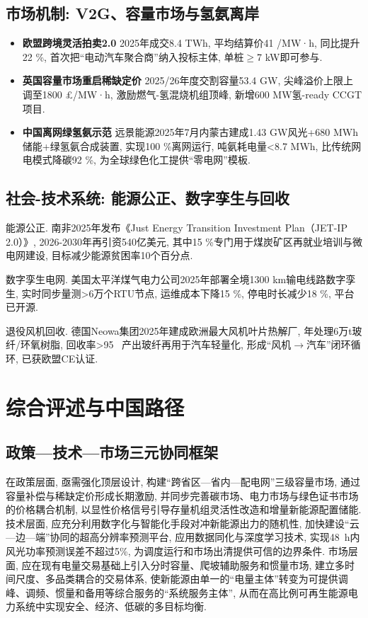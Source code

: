 \documentclass[a4paper,11pt,AutoFakeBold]{article}
\begin{document}
\subsection{市场机制: V2G、容量市场与氢氨离岸}
\begin{itemize}
  \item \textbf{欧盟跨境灵活拍卖2.0}  
  2025年成交8.4 TWh, 平均结算价41 \texteuro/MW·h, 同比提升22 \%, 首次把“电动汽车聚合商”纳入投标主体, 单桩$\geq$7 kW即可参与\cite{ref13}.   
  \item \textbf{英国容量市场重启稀缺定价}  
  2025/26年度交割容量53.4 GW, 尖峰溢价上限上调至1800 £/MW·h, 激励燃气-氢混烧机组顶峰, 新增600 MW氢-ready CCGT项目\cite{ref13}.   
  \item \textbf{中国离网绿氢氨示范}  
  远景能源2025年7月内蒙古建成1.43 GW风光+680 MWh储能+绿氢氨合成装置, 实现100 \%离网运行, 吨氨耗电量<8.7 MWh, 比传统网电模式降碳92 \%, 为全球绿色化工提供“零电网”模板\cite{ref13}.   
\end{itemize}

\subsection{社会-技术系统: 能源公正、数字孪生与回收}
能源公正. 南非2025年发布《Just Energy Transition Investment Plan（JET-IP 2.0）》, 2026-2030年再引资540亿美元, 其中15 \%专门用于煤炭矿区再就业培训与微电网建设, 目标减少能源贫困率10个百分点\cite{ref11}. 

数字孪生电网. 美国太平洋煤气电力公司2025年部署全境1300 km输电线路数字孪生, 实时同步量测>6万个RTU节点, 运维成本下降15 \%, 停电时长减少18 \%, 平台已开源\cite{ref11}. 

退役风机回收. 德国Neowa集团2025年建成欧洲最大风机叶片热解厂, 年处理6万t玻纤/环氧树脂, 回收率>95 \, 产出玻纤再用于汽车轻量化, 形成“风机$\to$汽车”闭环循环, 已获欧盟CE认证\cite{ref11}. 

\section{综合评述与中国路径}
\subsection{政策—技术—市场三元协同框架}
在政策层面, 亟需强化顶层设计, 构建“跨省区—省内—配电网”三级容量市场, 通过容量补偿与稀缺定价形成长期激励, 并同步完善碳市场、电力市场与绿色证书市场的价格耦合机制, 以显性价格信号引导存量机组灵活性改造和增量新能源配置储能\cite{ref40,ref28}. 技术层面, 应充分利用数字化与智能化手段对冲新能源出力的随机性, 加快建设“云—边—端”协同的超高分辨率预测平台, 应用数据同化与深度学习技术, 实现48~h内风光功率预测误差不超过5\%, 为调度运行和市场出清提供可信的边界条件\cite{ref30,ref31}. 市场层面, 应在现有电量交易基础上引入分时容量、爬坡辅助服务和惯量市场, 建立多时间尺度、多品类耦合的交易体系, 使新能源由单一的“电量主体”转变为可提供调峰、调频、惯量和备用等综合服务的“系统服务主体”, 从而在高比例可再生能源电力系统中实现安全、经济、低碳的多目标均衡\cite{ref32,ref35}. 
\end{document}
